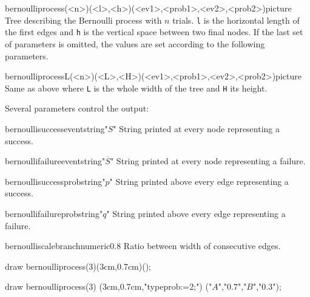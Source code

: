 \documentclass[11pt,a4paper,english]{article}
\begin{document}
\begin{rpobjet}{bernoulliprocess(<n>)(<l>,<h>)(<ev1>,<prob1>,<ev2>,<prob2>)}{picture}
Tree describing the Bernoulli process with $n$ trials. \verb|l| is the horizontal length of the first edges and \verb|h| is the vertical space between two final nodes. If the last set of parameters is omitted, the values are set according to the following parameters.
\end{rpobjet}


\begin{rpobjet}{bernoulliprocessL(<n>)(<L>,<H>)(<ev1>,<prob1>,<ev2>,<prob2>)}{picture}
Same as above where \verb|L| is the whole width of the tree and \verb|H| its height.
\end{rpobjet}



Several parameters control the output:

\begin{mptparam}{bernoullisuccessevent}{string}{"$S$"}
String printed at every node representing a success.
\end{mptparam}

\begin{mptparam}{bernoullifailureevent}{string}{"$\overline{S}$"}
String printed at every node representing a failure.
\end{mptparam}

\begin{mptparam}{bernoullisuccessprob}{string}{"$p$"}
String printed above every edge representing a success.
\end{mptparam}

\begin{mptparam}{bernoullifailureprob}{string}{"$q$"}
String printed above every edge representing a failure.
\end{mptparam}

\begin{mptparam}{bernoulliscalebranch}{numeric}{0.8}
Ratio between width of consecutive edges.
\end{mptparam}





\begin{exemple}[lefthand ratio=0.45]
draw bernoulliprocess(3)(3cm,0.7cm)();
\end{exemple}


\begin{exemple}[lefthand ratio=0.45]
draw bernoulliprocess(3)
         (3cm,0.7cm,"typeprob:=2;")
         ("$A$","$0.7$","$B$","$0.3$");
\end{exemple}
\end{document}
